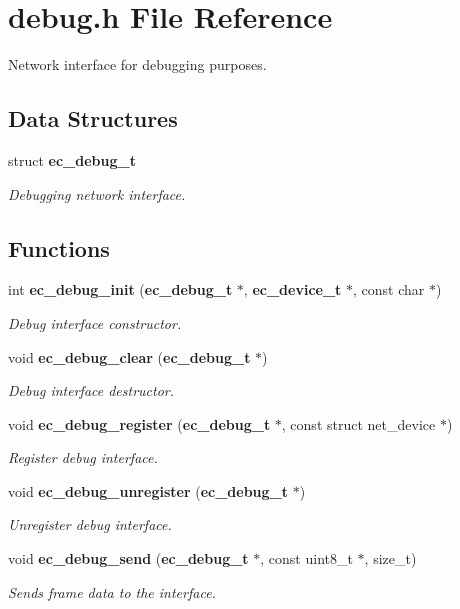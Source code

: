 \section{debug.\-h File Reference}
\label{debug_8h}


Network interface for debugging purposes.  


\subsection*{Data Structures}
\begin{DoxyCompactItemize}
\item 
struct {\bf ec\-\_\-debug\-\_\-t}
\begin{DoxyCompactList}\small\item\em Debugging network interface. \end{DoxyCompactList}\end{DoxyCompactItemize}
\subsection*{Functions}
\begin{DoxyCompactItemize}
\item 
int {\bf ec\-\_\-debug\-\_\-init} ({\bf ec\-\_\-debug\-\_\-t} $\ast$, {\bf ec\-\_\-device\-\_\-t} $\ast$, const char $\ast$)
\begin{DoxyCompactList}\small\item\em Debug interface constructor. \end{DoxyCompactList}\item 
void {\bf ec\-\_\-debug\-\_\-clear} ({\bf ec\-\_\-debug\-\_\-t} $\ast$)
\begin{DoxyCompactList}\small\item\em Debug interface destructor. \end{DoxyCompactList}\item 
void {\bf ec\-\_\-debug\-\_\-register} ({\bf ec\-\_\-debug\-\_\-t} $\ast$, const struct net\-\_\-device $\ast$)\label{debug_8h_a1d9b504f3765f22ec81c6e332f542add}

\begin{DoxyCompactList}\small\item\em Register debug interface. \end{DoxyCompactList}\item 
void {\bf ec\-\_\-debug\-\_\-unregister} ({\bf ec\-\_\-debug\-\_\-t} $\ast$)\label{debug_8h_aed729c6112e274fb57539f57f0101c59}

\begin{DoxyCompactList}\small\item\em Unregister debug interface. \end{DoxyCompactList}\item 
void {\bf ec\-\_\-debug\-\_\-send} ({\bf ec\-\_\-debug\-\_\-t} $\ast$, const uint8\-\_\-t $\ast$, size\-\_\-t)\label{debug_8h_a69e2cddd7db5ff1ac8b3e1896e7cc862}

\begin{DoxyCompactList}\small\item\em Sends frame data to the interface. \end{DoxyCompactList}\end{DoxyCompactItemize}


